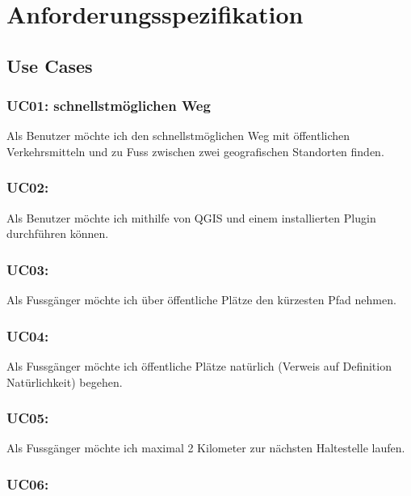 
\section{Anforderungsspezifikation}
\label{sec:Anforderungsspezifikation}

\subsection{Use Cases}
\label{sub:Use Cases}

\subsubsection{UC01: schnellstmöglichen Weg}
\label{usecase:UC01}

Als Benutzer möchte ich den schnellstmöglichen Weg mit öffentlichen Verkehrsmitteln und zu Fuss zwischen zwei geografischen Standorten finden.

\subsubsection{UC02: }
\label{usecase:UC02}

Als Benutzer möchte ich mithilfe  von QGIS und einem installierten Plugin durchführen können.

\subsubsection{UC03: }
\label{usecase:UC03}

Als Fussgänger möchte ich über öffentliche Plätze den kürzesten Pfad nehmen.

\subsubsection{UC04: }
\label{usecase:UC04}

Als Fussgänger möchte ich öffentliche Plätze natürlich (Verweis auf Definition Natürlichkeit) begehen.

\subsubsection{UC05: }
\label{usecase:UC05}

Als Fussgänger möchte ich maximal 2 Kilometer zur nächsten Haltestelle laufen.

\subsubsection{UC06: }
\label{usecase:UC06}

